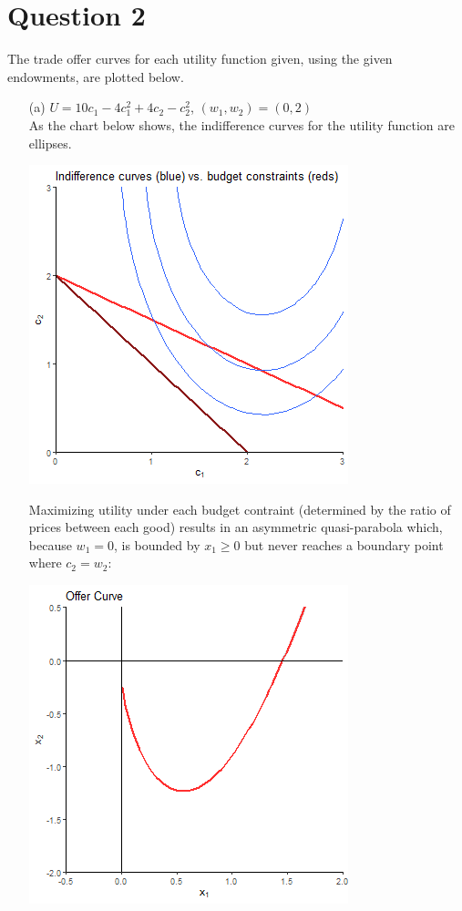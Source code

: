 \documentclass{article}
\begin{document}
\section*{Question 2}
The trade offer curves for each utility function given, using the given endowments, are plotted below.

\begin{itemize}
	\item[(a)] $U=10c_1-4c_1^2 + 4c_2-c_2^2$, $(w_1,w_2)=(0,2)$
		\smallskip \\
		As the chart below shows, the indifference curves for the utility function are ellipses.
		\begin{center}
			\includegraphics[scale=.6]{2a_IC-and-BC.png}
		\end{center}
		Maximizing utility under each budget contraint (determined by the ratio of prices between each good) results in an asymmetric quasi-parabola which, because $w_1=0$, is bounded by $x_1\geq 0$ but never reaches a boundary point where $c_2=w_2$:
		\begin{center}
			\includegraphics[scale=.6]{2a_offer-curve.png}
		\end{center}
		

\end{itemize}
\end{document}
